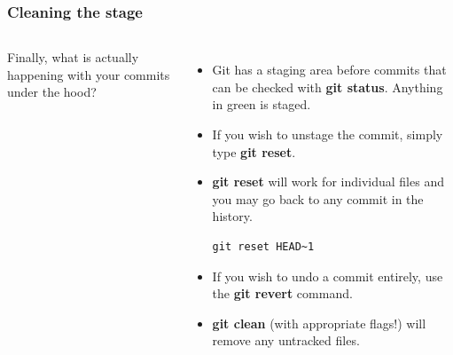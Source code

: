 \documentclass{beamer}
\begin{document}
\begin{frame}[fragile]
\frametitle{Cleaning the stage}
\begin{columns}
Finally, what is actually happening with your commits under the hood?
\begin{itemize}
\item Git has a staging area before commits that can be checked with \textbf{git status}. Anything in \textcolor{dkgreen}{green} is staged.
\item If you wish to unstage the commit, simply type \textbf{git reset}.
\item \textbf{git reset} will work for individual files and you may go back to any commit in the history.
        \begin{lstlisting}
git reset HEAD~1
        \end{lstlisting}
\item If you wish to undo a commit entirely, use the \textbf{git revert} command.
\item \textbf{git clean} (with appropriate flags!) will remove any untracked files.
\end{itemize}

\end{columns}
\end{frame}
\end{document}
